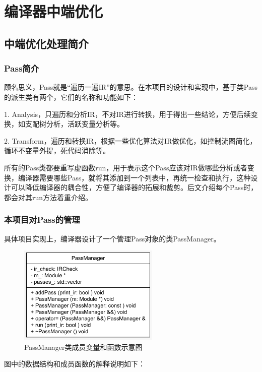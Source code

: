 
\chapter{编译器中端优化}
\section{中端优化处理简介}
\subsection{Pass简介}

顾名思义，Pass就是“遍历一遍IR”的意思。在本项目的设计和实现中，基于类Pass的派生类有两个，它们的名称和功能如下：

1. Analysis，只遍历和分析IR，不对IR进行转换，用于得出一些结论，方便后续变换，如支配树分析，活跃变量分析等。

2. Transform，遍历和转换IR，根据一些优化算法对IR做优化，如控制流图简化，循环不变量外提，死代码消除等。

所有的Pass类都要重写虚函数run，用于表示这个Pass应该对IR做哪些分析或者变换，编译器需要哪些Pass，就将其添加到一个列表中，再统一检查和执行，这种设计可以降低编译器的耦合性，方便了编译器的拓展和裁剪。后文介绍每个Pass时，都会对其run方法着重介绍。

\subsection{本项目对Pass的管理}

具体项目实现上，编译器设计了一个管理Pass对象的类PassManager。

\begin{figure}[htb]
  \centering
  \includegraphics[width=0.6\textwidth]{figures/PassManagerUML.pdf}
  \caption{PassManager类成员变量和函数示意图}
  \label{fig:passMnager}
\end{figure}

图中的数据结构和成员函数的解释说明如下：

